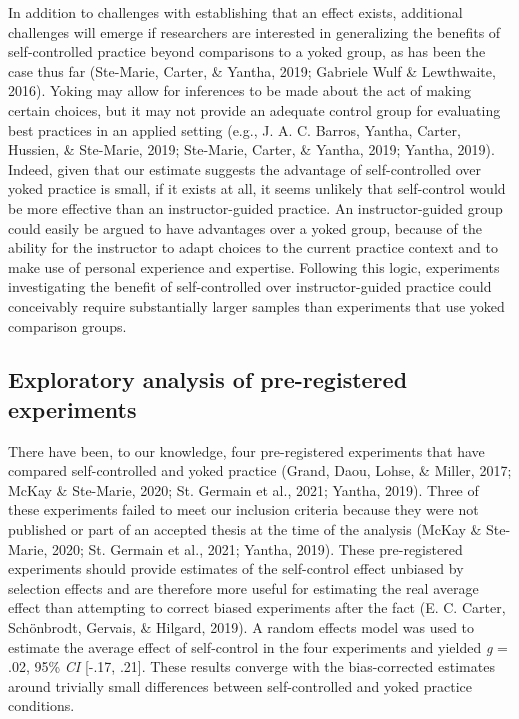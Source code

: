 \documentclass[
  english,
  man,floatsintext]{apa7}
\begin{document}
In addition to challenges with establishing that an effect exists, additional challenges will emerge if researchers are interested in generalizing the benefits of self-controlled practice beyond comparisons to a yoked group, as has been the case thus far (Ste-Marie, Carter, \& Yantha, 2019; Gabriele Wulf \& Lewthwaite, 2016). Yoking may allow for inferences to be made about the act of making certain choices, but it may not provide an adequate control group for evaluating best practices in an applied setting (e.g., J. A. C. Barros, Yantha, Carter, Hussien, \& Ste-Marie, 2019; Ste-Marie, Carter, \& Yantha, 2019; Yantha, 2019). Indeed, given that our estimate suggests the advantage of self-controlled over yoked practice is small, if it exists at all, it seems unlikely that self-control would be more effective than an instructor-guided practice. An instructor-guided group could easily be argued to have advantages over a yoked group, because of the ability for the instructor to adapt choices to the current practice context and to make use of personal experience and expertise. Following this logic, experiments investigating the benefit of self-controlled over instructor-guided practice could conceivably require substantially larger samples than experiments that use yoked comparison groups.

\hypertarget{exploratory-analysis-of-pre-registered-experiments}{%
\subsection{Exploratory analysis of pre-registered experiments}\label{exploratory-analysis-of-pre-registered-experiments}}

There have been, to our knowledge, four pre-registered experiments that have compared self-controlled and yoked practice (Grand, Daou, Lohse, \& Miller, 2017; McKay \& Ste-Marie, 2020; St. Germain et al., 2021; Yantha, 2019). Three of these experiments failed to meet our inclusion criteria because they were not published or part of an accepted thesis at the time of the analysis (McKay \& Ste-Marie, 2020; St. Germain et al., 2021; Yantha, 2019). These pre-registered experiments should provide estimates of the self-control effect unbiased by selection effects and are therefore more useful for estimating the real average effect than attempting to correct biased experiments after the fact (E. C. Carter, Schönbrodt, Gervais, \& Hilgard, 2019). A random effects model was used to estimate the average effect of self-control in the four experiments and yielded \emph{g} = .02, 95\% \emph{CI} {[}-.17, .21{]}. These results converge with the bias-corrected estimates around trivially small differences between self-controlled and yoked practice conditions.
\end{document}
